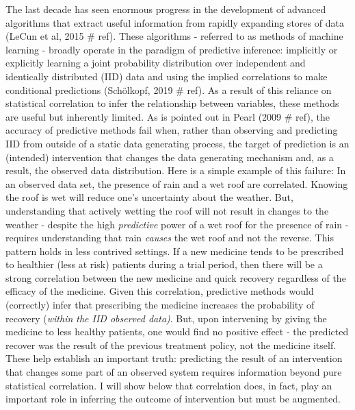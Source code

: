 \documentclass[../main.tex]{subfiles}
\begin{document}
The last decade has seen enormous progress in the development of advanced algorithms that extract useful information from rapidly expanding stores of data (LeCun et al, 2015 $\#$ ref). These algorithms - referred to as methods of machine learning - broadly operate in the paradigm of predictive inference: implicitly or explicitly learning a joint probability distribution over independent and identically distributed (IID) data and using the implied correlations to make conditional predictions (Schölkopf, 2019 $\#$ ref). As a result of this reliance on statistical correlation to infer the relationship between variables, these methods are useful but inherently limited. As is pointed out in Pearl (2009 $\#$ ref), the accuracy of predictive methods fail when, rather than observing and predicting IID from outside of a static data generating process, the target of prediction is an (intended) intervention that changes the data generating mechanism and, as a result, the observed data distribution. Here is a simple example of this failure: In an observed data set, the presence of rain and a wet roof are correlated. Knowing the roof is wet will reduce one’s uncertainty about the weather. But, understanding that actively wetting the roof will not result in changes to the weather - despite the high \textit{predictive} power of a wet roof for the presence of rain - requires understanding that rain \textit{causes} the wet roof and not the reverse. This pattern holds in less contrived settings. If a new medicine tends to be prescribed to healthier (less at risk) patients during a trial period, then there will be a strong correlation between the new medicine and quick recovery regardless of the efficacy of the medicine. Given this correlation, predictive methods would (correctly) infer that prescribing the medicine increases the probability of recovery (\textit{within the IID observed data)}. But, upon intervening by giving the medicine to less healthy patients, one would find no positive effect - the predicted recover was the result of the previous treatment policy, not the medicine itself. These help establish an important truth: predicting the result of an intervention that changes some part of an observed system requires information beyond pure statistical correlation. I will show below that correlation does, in fact, play an important role in inferring the outcome of intervention but must be augmented.\par
\end{document}
